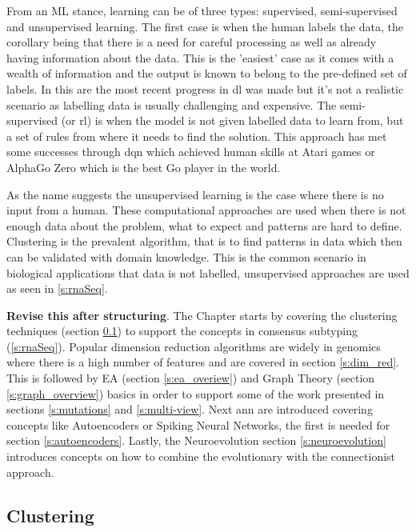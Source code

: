 From an ML stance, learning can be of three types: supervised, semi-supervised and unsupervised learning. The first case is when the human labels the data, the corollary being that there is a need for careful processing as well as already having information about the data. This is the 'easiest' case as it comes with a wealth of information and the output is known to belong to the pre-defined set of labels. In this are the most recent progress in \acrfull{dl} was made but it's not a realistic scenario as labelling data is usually challenging and expensive. The semi-supervised (or \acrfull{rl}) is when the model is not given labelled data to learn from, but a set of rules from where it needs to find the solution. This approach has met some successes through \acrfull{dqn} which achieved human skills at Atari games\cite{Mnih2015-cw} or AlphaGo Zero\cite{Silver2017-sw} which is the best Go player in the world. 

As the name suggests the unsupervised learning is the case where there is no input from a human. These computational approaches are used when there is not enough data about the problem, what to expect and patterns are hard to define. Clustering is the prevalent algorithm, that is to find patterns in data which then can be validated with domain knowledge. This is the common scenario in biological applications that data is not labelled, unsupervised approaches are used as seen in \ref{s:rnaSeq}.


\textbf{Revise this after structuring}. The Chapter starts by covering the clustering techniques (section \ref{s:clustering}) to support the concepts in consensus subtyping (\ref{s:rnaSeq}). Popular dimension reduction algorithms are widely in genomics where there is a high number of features and are covered in section \ref{s:dim_red}. This is followed by EA (section \ref{s:ea_overiew}) and Graph Theory (section \ref{s:graph_overview}) basics in order to support some of the work presented in sections \ref{s:mutations} and \ref{s:multi-view}. Next \acrlong{ann} are introduced covering concepts like Autoencoders or Spiking Neural Networks, the first is needed for section \ref{s:autoencoders}. Lastly, the Neuroevolution section \ref{s:neuroevolution} introduces concepts on how to combine the evolutionary with the connectionist approach. 

\subsection{Clustering} \label{s:clustering}


